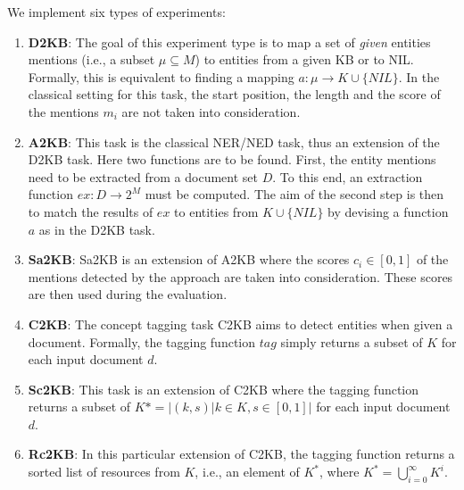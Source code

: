 We implement six types of experiments:
\begin{enumerate}
\item \textbf{D2KB}: The goal of this experiment type is to map a set of \emph{given} entities mentions (i.e., a subset $\mu \subseteq M$) to entities from a given \ac{KB} or to NIL. Formally, this is equivalent to finding a mapping $a: \mu \rightarrow K \cup \{NIL\}$. In the classical setting for this task, the start position, the length and the score of the mentions $m_i$ are not taken into consideration. 
\item \textbf{A2KB}: This task is the classical \ac{NER}/\ac{NED} task, thus an extension of the D2KB task. Here two functions are to be found. First, the entity mentions need to be extracted from a document set $D$. To this end, an extraction function $ex: D \rightarrow 2^M$ must be computed. The aim of the second step is then to match the results of $ex$ to entities from $K \cup \{NIL\}$ by devising a function $a$ as in the D2KB task.
\item \textbf{Sa2KB}:
Sa2KB is an extension of A2KB where the scores $c_i \in [0,1]$ of the mentions detected by the approach are taken into consideration. These scores are then used during the evaluation.
\item \textbf{C2KB}: The concept tagging task C2KB aims to detect entities when given a document. Formally, the tagging function $tag$ simply returns a subset of $K$ for each input document $d$.
\item \textbf{Sc2KB}: This task is an extension of C2KB where the tagging function returns a subset of $K* = |{(k,s)|k\in K, s \in[0,1]|}$ for each input document $d$.
\item \textbf{Rc2KB}: In this particular extension of C2KB, the tagging function returns a sorted list of resources from $K$, i.e., an element of $K^*$, where $K^* = \bigcup\limits_{i=0}^\infty K^i$. 
\end{enumerate}

